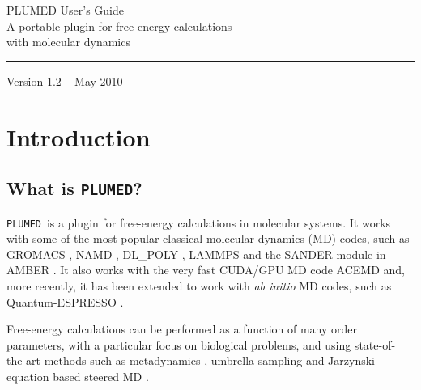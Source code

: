 \documentclass[12pt,fleqn]{report}
\newcommand{\plumed}{{\tt PLUMED}}
\begin{document}
\begin{titlepage}
\vspace{4cm}
\begin{flushleft}
{
 {    \Huge{PLUMED User's Guide}} \\ \vspace{.5cm}
 {   \selectfont \Large{A portable plugin for free-energy calculations \\ with  molecular dynamics}}
}
\rule{12cm}{4pt}
\end{flushleft}
\vspace{10cm}


\begin{flushright}
    \large{Version 1.2 -- May 2010}
\end{flushright}



\end{titlepage}

\tableofcontents

\chapter{Introduction}
\label{ch.introduction}

\section{What is \plumed?} 

 \plumed \ is a plugin for free-energy calculations in molecular
systems.  It works with some of the most popular classical molecular dynamics (MD) codes,
such as GROMACS \cite{Hess:2008p11450}, NAMD \cite{NAMD}, DL\_POLY \cite{dlpoly} , LAMMPS \cite{lammps}
and the  SANDER module in AMBER \cite{Case:2006p16366}.
It also works with the very fast CUDA/GPU MD code ACEMD \cite{acemd} and,
more recently, it has been extended to work with \emph{ab initio} MD codes,
such as Quantum-ESPRESSO \cite{giannozzi09jpcm}.

Free-energy calculations can be performed as a function of
many order parameters, with a particular focus on biological problems, and using
state-of-the-art methods such as metadynamics \cite{metad}, umbrella sampling \cite{torrie-valleau,wham1,wham2} and
Jarzynski-equation based steered MD \cite{jarzynski,Crooks98}.  
\end{document}

